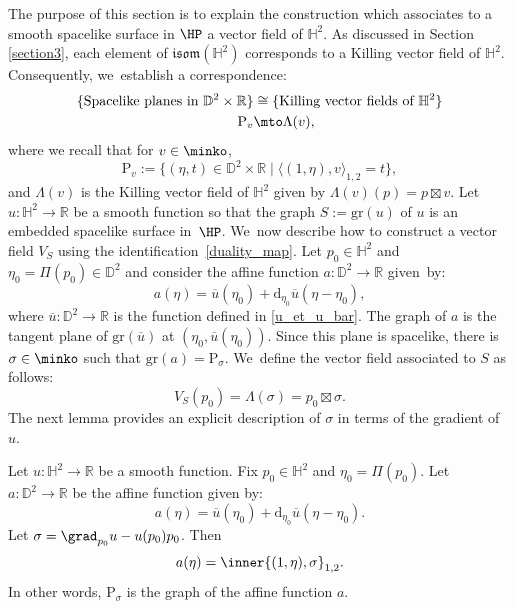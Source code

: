 The purpose of this section is to explain the construction which associates to a smooth spacelike surface in $\HP$ a vector field of $\mathbb{H}^2$. As discussed in Section \ref{section3}, each element of $\mathfrak{isom}(\mathbb{H}^2)$ corresponds to a Killing vector field of $\mathbb{H}^2$. Consequently, we~establish a correspondence:
\begin{equation}\label{duality_map}
\begin{aligned}
\{\text{Spacelike planes in } \mathbb{D}^2\times\mathbb{R}\} & \cong \{\text{Killing vector fields of } \mathbb{H}^2\} \\
\mathrm{P}_v& \mto \Lambda(v),
\end{aligned}
\end{equation}
where we recall that for $v\in\minko$,
\[
\mathrm{P}_v:=\{(\eta,t)\in\mathbb{D}^2\times\mathbb{R} \mid \langle (1,\eta),v \rangle_{1,2}=t \},
\]
and $\Lambda(v)$ is the Killing vector field of $\mathbb{H}^2$ given by $\Lambda(v)(p)=p\boxtimes v$.
Let $u:\mathbb{H}^2\to \mathbb{R}$ be a smooth function so that the graph $S:=\mathrm{gr}(u)$ of $u$ is an embedded spacelike surface in~$\HP$. We~now describe how to construct a vector field $V_S$ using the identification~\eqref{duality_map}. Let $p_0\in\mathbb{H}^2$ and $\eta_0=\Pi(p_0)\in \mathbb{D}^2$ and consider the affine function $a:\mathbb{D}^2\to \mathbb{R}$ given~by:
\[
a(\eta)=\overline{u}(\eta_0)+\mathrm{d}_{\eta_0}\overline{u}(\eta-\eta_0),
\]
where $\overline{u}: \mathbb{D}^2 \to \mathbb{R}$ is the function defined in \eqref{u_et_u_bar}.
The graph of $a$ is the tangent plane of $\mathrm{gr}(\overline{u})$ at $(\eta_0,\overline{u}(\eta_0))$. Since this plane is spacelike, there is $\sigma\in\minko$ such that $\mathrm{gr}(a)=\mathrm{P}_{\sigma}$. We~define the vector field associated to $S$ as follows:
\begin{equation}\label{XS}
V_S(p_0)=\Lambda(\sigma)= p_0\boxtimes \sigma.
\end{equation}
The next lemma provides an explicit description of $\sigma$ in terms of the gradient of $u$.

\begin{lemma}\label{sigma_lemma}
Let $u:\mathbb{H}^2\to\mathbb{R}$ be a smooth function. Fix $p_0\in\mathbb{H}^2$ and $\eta_0=\Pi(p_0)$. Let $a:\mathbb{D}^2\to \mathbb{R}$ be the affine function given by:
\[
a(\eta)=\overline{u}(\eta_0)+\mathrm{d}_{\eta_0}\overline{u}(\eta-\eta_0).
\]
Let $\sigma=\grad_{p_0}u-u(p_0)p_0$. Then
\[
a(\eta)=\inner{(1,\eta),\sigma}_{1,2}.
\]
In other words, $\mathrm{P}_{\sigma}$ is the graph of the affine function $a$.
\end{lemma}

